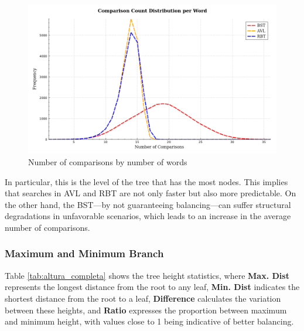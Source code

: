  \begin{figure}[H]
     \centering
     \includegraphics[width=0.8\linewidth]{img/Graph_6_10103.pdf}
     \caption{Number of comparisons by number of words}
     \label{fig:comparacoes}
 \end{figure}


 In particular, this is the level of the tree that has the most nodes. This implies that searches in AVL and RBT are not only faster but also more predictable.
 On the other hand, the BST—by not guaranteeing balancing—can suffer structural degradations in unfavorable scenarios, which leads to an increase in the average number of comparisons.

 \subsubsection{Maximum and Minimum Branch}

 Table \ref{tab:altura_completa} shows the tree height statistics,
 where \textbf{Max. Dist} represents the longest distance from the root to any leaf,
 \textbf{Min. Dist} indicates the shortest distance from the root to a leaf, \textbf{Difference}
 calculates the variation between these heights, and \textbf{Ratio} expresses the proportion between maximum
 and minimum height, with values close to 1 being indicative of better balancing.

